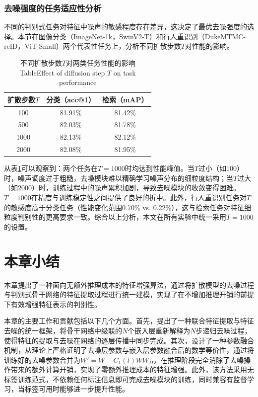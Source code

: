 \subsubsection{去噪强度的任务适应性分析}

不同的判别式任务对特征中噪声的敏感程度存在差异，这决定了最优去噪强度的选择。本节在图像分类（ImageNet-1k，SwinV2-T）和行人重识别（DukeMTMC-reID，ViT-Small）两个代表性任务上，分析不同扩散步数$T$对性能的影响。

\begin{table}[htbp]
\centering
\caption{不同扩散步数$T$对两类任务性能的影响\protect\\[-2pt]{\rm Table\;\thetable\quad Effect of diffusion step $T$ on task performance}}\label{tab:chap3_step_T}
\vspace{0.2cm}
\renewcommand{\arraystretch}{1.2}
\begin{tabular}{c|cc}
\hline\hline
扩散步数$T$ & 分类（acc@1） & 检索（mAP） \\
\hline
100 & 81.91\% & 81.42\% \\
500 & 82.03\% & 81.78\% \\
1000 & 82.13\% & 82.12\% \\
2000 & 82.08\% & 81.95\% \\
\hline\hline
\end{tabular}
\end{table}

从表\ref{tab:chap3_step_T}可以观察到：两个任务在$T=1000$时均达到性能峰值。当$T$过小（如100）时，噪声调度过于粗糙，去噪模块难以精确学习噪声分布的细粒度结构；当$T$过大（如2000）时，训练过程中的噪声累积加剧，导致去噪模块的收敛变得困难。$T=1000$在精度与训练稳定性之间提供了良好的折中。此外，行人重识别任务对$T$的敏感度高于分类任务（性能变化范围0.70\% vs. 0.22\%），这与检索任务对特征细粒度判别性的更高要求一致。综合以上分析，本文在所有实验中统一采用$T=1000$的设置。

\section{本章小结}
\label{sec:chap3_summary}

本章提出了一种面向无额外推理成本的特征增强算法，通过将扩散模型的去噪过程与判别式骨干网络的特征提取过程进行统一建模，实现了在不增加推理开销的前提下有效增强特征表示的判别性。

本章的主要工作和贡献包括以下几个方面。首先，提出了一种联合特征提取与特征去噪的统一框架，将骨干网络中级联的$N$个嵌入层重新解释为$N$步递归去噪过程，使得特征的提取与去噪在网络的逐层传播中同步完成。其次，设计了一种参数融合机制，从理论上严格证明了去噪层参数与嵌入层参数融合后的数学等价性，通过将训练好的去噪参数合并为$W' = W - C_1(t)WW_D$，在推理阶段完全消除了去噪操作带来的额外计算开销，实现了零额外推理成本的特征增强。此外，该方法采用无标签训练范式，不依赖任何标注信息即可完成去噪模块的训练，同时兼容有监督学习，当标签可用时能够进一步提升性能。

